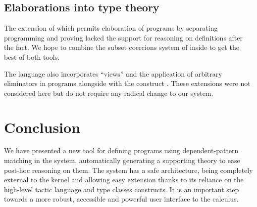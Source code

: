 \subsection{Elaborations into type theory}
The \Program \cite{sozeau.thesis} extension of \Coq
which permits elaboration of \Coq programs by separating programming and
proving lacked the support for reasoning on definitions after the fact.
We hope to combine the subset coercions system of \Program inside 
\Equations to get the best of both tools.

The \Epigram language also incorporates ``views'' and the application of
arbitrary eliminators in programs alongside with the  construct
\cite{DBLP:journals/jfp/McBrideM04}. These extensions were not
considered here but do not require any radical change to our system.

\section{Conclusion}
\label{sec:conclusion}

We have presented a new tool for defining programs using
dependent-pattern matching in the \Coq system, automatically 
generating a supporting theory to ease post-hoc reasoning on them.
The system has a safe architecture, being completely external to the
kernel and allowing easy extension thanks to its reliance on the
high-level tactic language and type classes constructs. It is an
important step towards a more robust, accessible and powerful user
interface to the calculus.

